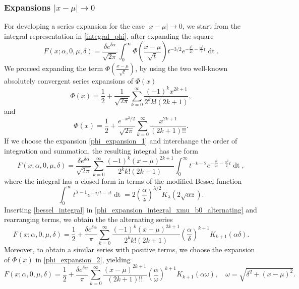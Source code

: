 \documentclass[10pt,a4paper,oneside]{article}
\numberwithin{equation}{section}
\begin{document}
\subsubsection{Expansions $|x-\mu| \to 0$}
For developing a series expansion for the case $|x-\mu| \to 0$, we start from the integral representation in \eqref{integral_phi}, after expanding the square
\begin{equation}\label{integral_phi2}
F(x; \alpha, 0, \mu, \delta) = \frac{\delta e^{\delta \alpha}}{\sqrt{2\pi}} \int_0^{\infty} \Phi\left(\frac{x - \mu}{\sqrt{t}}\right) t^{-3/2} e^{-\frac{\delta^2}{2t} - \frac{\alpha^2}{2}t} \mathop{dt}.
\end{equation}
We proceed expanding the term $\Phi\left(\frac{x-\mu}{\sqrt{t}}\right)$, by using the two well-known absolutely convergent series expansions of $\Phi(x)$ \cite[\S 2]{Lebedev1972}
\begin{equation}\label{phi_expansion_1}
\Phi(x) = \frac{1}{2} + \frac{1}{\sqrt{2\pi}}\sum_{k=0}^{\infty} \frac{(-1)^k x^{2k + 1}}{2^k k! (2k+1)},
\end{equation}
and
\begin{equation}\label{phi_expansion_2}
\Phi(x) = \frac{1}{2} + \frac{e^{-x^2 / 2}}{\sqrt{2\pi}}\sum_{k=0}^{\infty} \frac{x^{2k+1}}{(2k + 1)!!}.
\end{equation}
If we choose the expansion \eqref{phi_expansion_1} and interchange the order of integration and summation, the resulting integral has the form
\begin{equation}\label{phi_expansion_integral_xmu_b0_alternating}
F(x; \alpha, 0, \mu, \delta) = \frac{\delta e^{\delta \alpha}}{\sqrt{2\pi}} \sum_{k=0}^{\infty} \frac{(-1)^k (x-\mu)^{2k + 1}}{2^k k! (2k + 1)}\int_0^{\infty} t^{-k-2} e^{-\frac{\delta^2}{2t} - \frac{\alpha^2}{2}t} \mathop{dt},
\end{equation}
where the integral has a closed-form in terms of the modified Bessel function
\begin{equation}\label{bessel_integral}
\int_0^{\infty} t^{\lambda - 1}e^{-a/t - zt} \mathop{dt} = 2\left(\frac{\alpha}{z}\right)^{\lambda/2} K_{\lambda}(2\sqrt{\alpha z}).
\end{equation}
Inserting \eqref{bessel_integral} in \eqref{phi_expansion_integral_xmu_b0_alternating} and rearranging terms, we obtain the the alternating series
\begin{equation}\label{expansion_xmu_b0_alternating}
F(x; \alpha, 0, \mu, \delta) = \frac{1}{2} + \frac{\delta e^{\delta \alpha}}{\pi}\sum_{k=0}^{\infty} \frac{(-1)^k (x-\mu)^{2k+1}}{2^k k! (2k + 1)} \left(\frac{\alpha}{\delta}\right)^{k+1}K_{k+1}(\alpha \delta).
\end{equation}
Moreover, to obtain a similar series with positive terms, we choose the expansion of $\Phi(x)$ in \eqref{phi_expansion_2}, yielding
\begin{equation}\label{expansion_xmu_b0_positive}
F(x; \alpha, 0, \mu, \delta) = \frac{1}{2} + \frac{\delta e^{\delta \alpha}} {\pi}\sum_{k=0}^{\infty} \frac{(x-\mu)^{2k+1}}{(2k +1)!!} \left(\frac{\alpha}{\omega}\right)^{k+1}K_{k+1}(\alpha \omega), \quad \omega = \sqrt{\delta^2 + (x-\mu)^2}.
\end{equation}
\end{document}
